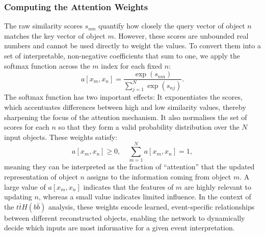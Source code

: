 \subsubsection{Computing the Attention Weights}
The raw similarity scores $s_{nm}$ quantify how closely the query vector of object $n$ matches the key vector of object $m$. However, these scores are unbounded real numbers and cannot be used directly to weight the values. To convert them into a set of interpretable, non-negative coefficients that sum to one, we apply the softmax function across the $m$ index for each fixed $n$:
\begin{equation}
a[x_m, x_n] = \frac{\exp(s_{nm})}{\sum_{j=1}^N \exp(s_{nj})}.
\end{equation}
The softmax function has two important effects: It exponentiates the scores, which accentuates differences between high and low similarity values, thereby sharpening the focus of the attention mechanism. It also normalises the set of scores for each $n$ so that they form a valid probability distribution over the $N$ input objects. These weights satisfy:
\begin{equation}
a[x_m, x_n] \ge 0, \quad \sum_{m=1}^N a[x_m, x_n] = 1,
\end{equation}
meaning they can be interpreted as the fraction of ``attention'' that the updated representation of object $n$ assigns to the information coming from object $m$. 
A large value of $a[x_m, x_n]$ indicates that the features of $m$ are highly relevant to updating $n$, whereas a small value indicates limited influence. 
In the context of the $t\bar{t}H(b\bar{b})$ analysis, these weights encode learned, event-specific relationships between different reconstructed objects, enabling the network to dynamically decide which inputs are most informative for a given event interpretation.
